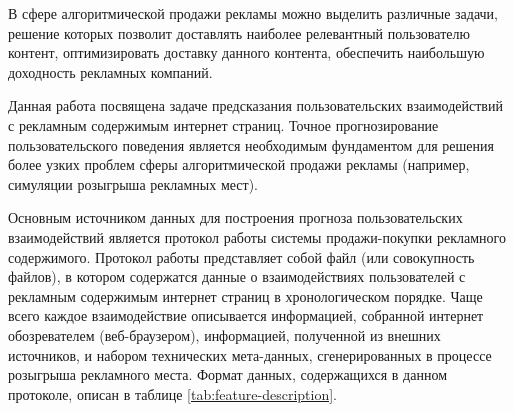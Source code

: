 В сфере алгоритмической продажи рекламы можно выделить различные задачи, решение которых позволит
доставлять наиболее релевантный пользователю контент, оптимизировать доставку данного контента, 
обеспечить наибольшую доходность рекламных компаний.

Данная работа посвящена задаче предсказания пользовательских взаимодействий с рекламным содержимым интернет страниц.
Точное прогнозирование пользовательского поведения является необходимым фундаментом для решения более узких проблем
сферы алгоритмической продажи рекламы (например, симуляции розыгрыша рекламных мест).

Основным источником данных для построения прогноза пользовательских взаимодействий является протокол работы 
системы продажи-покупки рекламного содержимого. Протокол работы представляет собой файл (или совокупность файлов), 
в котором содержатся данные о взаимодействиях пользователей с рекламным содержимым интернет страниц в хронологическом
порядке. Чаще всего каждое взаимодействие описывается информацией, собранной интернет обозревателем (веб-браузером), 
информацией, полученной из внешних источников, и набором технических мета-данных, сгенерированных в процессе розыгрыша 
рекламного места. Формат данных, содержащихся в данном протоколе, описан в таблице \ref{tab:feature-description}.

